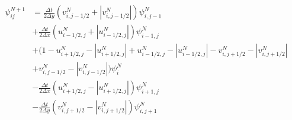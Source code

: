 \documentclass[10pt, a4paper]{article}
\newcommand{\abs}[1]{\left\lvert#1\right\rvert}
\begin{document}
\begin{equation}
\begin{split}
\psi_{ij}^{N+1} &=
\frac{\Delta t}{2 \Delta y} \left( v_{i,j-1/2}^N + \abs{v_{i,j-1/2}^N} \right) \psi_{i,j-1}^N\\
&+\frac{\Delta t}{2 \Delta x} \left( u_{i-1/2,j}^N + \abs{u_{i-1/2,j}^N} \right) \psi_{i-1,j}^N\\
&+ \Big(1 - u_{i+1/2,j}^N - \abs{u_{i+1/2,j}^N} + u_{i-1/2,j}^N - \abs{u_{i-1/2,j}^N} - v_{i,j+1/2}^N - \abs{v_{i,j+1/2}^N} \\
&+ v_{i,j-1/2}^N - \abs{v_{i,j-1/2}^N} \Big) \psi_i^N\\
&-\frac{\Delta t}{2 \Delta x} \left( u_{i+1/2,j}^N - \abs{u_{i+1/2,j}^N} \right) \psi_{i+1,j}^N\\
&-\frac{\Delta t}{2 \Delta y} \left( v_{i,j+1/2}^N - \abs{v_{i,j+1/2}^N} \right) \psi_{i,j+1}^N\\
\end{split}
\end{equation}



\end{document}
